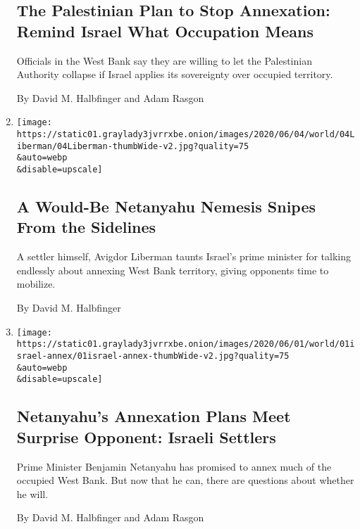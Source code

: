 \begin{enumerate}
  \hypertarget{the-palestinian-plan-to-stop-annexation-remind-israel-what-occupation-means}{%
  \subsection{The Palestinian Plan to Stop Annexation: Remind Israel
  What Occupation
  Means}\label{the-palestinian-plan-to-stop-annexation-remind-israel-what-occupation-means}}

  Officials in the West Bank say they are willing to let the Palestinian
  Authority collapse if Israel applies its sovereignty over occupied
  territory.

  By David M. Halbfinger and Adam Rasgon
\item
  \href{/2020/06/04/world/middleeast/israel-liberman-netanyahu-annexation-west-bank.html}{}

  \texttt{[image: https://static01.graylady3jvrrxbe.onion/images/2020/06/04/world/04Liberman/04Liberman-thumbWide-v2.jpg?quality=75\\\&auto=webp\\\&disable=upscale]}

  \hypertarget{a-would-be-netanyahu-nemesis-snipes-from-the-sidelines}{%
  \subsection{A Would-Be Netanyahu Nemesis Snipes From the
  Sidelines}\label{a-would-be-netanyahu-nemesis-snipes-from-the-sidelines}}

  A settler himself, Avigdor Liberman taunts Israel's prime minister for
  talking endlessly about annexing West Bank territory, giving opponents
  time to mobilize.

  By David M. Halbfinger
\item
  \href{/2020/06/01/world/middleeast/israel-annex-netanyahu-westbank.html}{}

  \texttt{[image: https://static01.graylady3jvrrxbe.onion/images/2020/06/01/world/01israel-annex/01israel-annex-thumbWide-v2.jpg?quality=75\\\&auto=webp\\\&disable=upscale]}

  \hypertarget{netanyahus-annexation-plans-meet-surprise-opponent-israeli-settlers}{%
  \subsection{Netanyahu's Annexation Plans Meet Surprise Opponent:
  Israeli
  Settlers}\label{netanyahus-annexation-plans-meet-surprise-opponent-israeli-settlers}}

  Prime Minister Benjamin Netanyahu has promised to annex much of the
  occupied West Bank. But now that he can, there are questions about
  whether he will.

  By David M. Halbfinger and Adam Rasgon
\end{enumerate}

